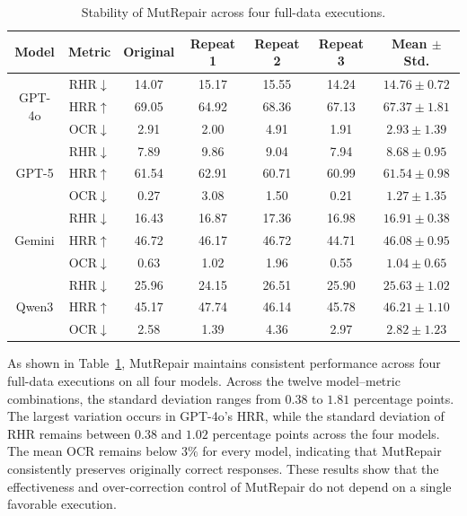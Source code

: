 \documentclass[acmsmall,screen,review,anonymous]{acmart}
\begin{document}
\begin{table}[t]
  \centering
  \footnotesize
  \setlength{\tabcolsep}{3pt}
  \caption{Stability of MutRepair across four full-data executions.}
  \begin{tabular}{cc | cccc | c}
    \toprule
    Model & Metric & Original & Repeat 1 & Repeat 2 & Repeat 3 & Mean $\pm$ Std. \\
    \midrule
    \multirow{3}{*}{GPT-4o}
      & RHR$\downarrow$ & 14.07 & 15.17 & 15.55 & 14.24 & $14.76 \pm 0.72$ \\
      & HRR$\uparrow$   & 69.05 & 64.92 & 68.36 & 67.13 & $67.37 \pm 1.81$ \\
      & OCR$\downarrow$ & 2.91  & 2.00 & 4.91 & 1.91 & $2.93 \pm 1.39$ \\
    \midrule
    \multirow{3}{*}{GPT-5}
      & RHR$\downarrow$ & 7.89  & 9.86 & 9.04 & 7.94 & $8.68 \pm 0.95$ \\
      & HRR$\uparrow$   & 61.54 & 62.91 & 60.71 & 60.99 & $61.54 \pm 0.98$ \\
      & OCR$\downarrow$ & 0.27  & 3.08 & 1.50 & 0.21 & $1.27 \pm 1.35$ \\
    \midrule
    \multirow{3}{*}{Gemini}
      & RHR$\downarrow$ & 16.43 & 16.87 & 17.36 & 16.98 & $16.91 \pm 0.38$ \\
      & HRR$\uparrow$   & 46.72 & 46.17 & 46.72 & 44.71 & $46.08 \pm 0.95$ \\
      & OCR$\downarrow$ & 0.63  & 1.02 & 1.96 & 0.55 & $1.04 \pm 0.65$ \\
    \midrule
    \multirow{3}{*}{Qwen3}
      & RHR$\downarrow$ & 25.96 & 24.15 & 26.51 & 25.90 & $25.63 \pm 1.02$ \\
      & HRR$\uparrow$   & 45.17 & 47.74 & 46.14 & 45.78 & $46.21 \pm 1.10$ \\
      & OCR$\downarrow$ & 2.58  & 1.39 & 4.36 & 2.97 & $2.82 \pm 1.23$ \\
    \bottomrule
  \end{tabular}
  \label{tab:rq3.1}
\end{table}

As shown in Table~\ref{tab:rq3.1}, MutRepair maintains consistent performance across four full-data executions on all four models. Across the twelve model--metric combinations, the standard deviation ranges from $0.38$ to $1.81$ percentage points. The largest variation occurs in GPT-4o's HRR, while the standard deviation of RHR remains between $0.38$ and $1.02$ percentage points across the four models. The mean OCR remains below $3\%$ for every model, indicating that MutRepair consistently preserves originally correct responses. These results show that the effectiveness and over-correction control of MutRepair do not depend on a single favorable execution.
\end{document}
